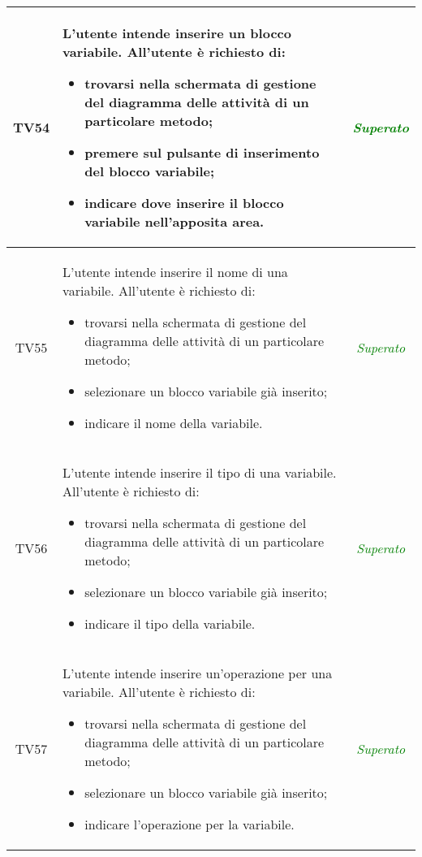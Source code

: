 \begin{longtable}{|c|>{}m{8cm}|c|}
\hypertarget{TV4.1}{TV54} & L'utente intende inserire un blocco variabile.
All'utente è richiesto di:
\begin{itemize}
	\item trovarsi nella schermata di gestione del diagramma delle attività di un particolare metodo;
	\item premere sul pulsante di inserimento del blocco variabile;
	\item indicare dove inserire il blocco variabile nell'apposita area.
\end{itemize} & \textcolor{Green}{\textit{Superato}}\\ \hline

\hypertarget{TV4.1.1}{TV55} & L'utente intende inserire il nome di una variabile.
All'utente è richiesto di:
\begin{itemize}
	\item trovarsi nella schermata di gestione del diagramma delle attività di un particolare metodo;
	\item selezionare un blocco variabile già inserito;
	\item indicare il nome della variabile.
\end{itemize} & \textcolor{Green}{\textit{Superato}}\\ \hline

\hypertarget{TV4.1.2}{TV56} & L'utente intende inserire il tipo di una variabile.
All'utente è richiesto di:
\begin{itemize}
	\item trovarsi nella schermata di gestione del diagramma delle attività di un particolare metodo;
	\item selezionare un blocco variabile già inserito;
	\item indicare il tipo della variabile.
\end{itemize} & \textcolor{Green}{\textit{Superato}}\\ \hline

\hypertarget{TV4.1.3}{TV57} & L'utente intende inserire un'operazione per una variabile.
All'utente è richiesto di:
\begin{itemize}
	\item trovarsi nella schermata di gestione del diagramma delle attività di un particolare metodo;
	\item selezionare un blocco variabile già inserito;
	\item indicare l'operazione per la variabile.
\end{itemize} & \textcolor{Green}{\textit{Superato}}\\ \hline


\end{longtable}
